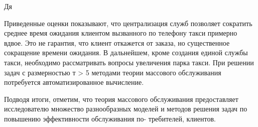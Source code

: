 Дя

Приведенные оценки показывают, что централизация служб позволяет сократить среднее время ожидания клиентом вызванного по телефону такси примерно вдвое. Это не гарантия, что клиент откажется от заказа, но существенное сокращение времени ожидания. В дальнейшем, кроме создания единой службы такси, необходимо рассматривать вопросы увеличения парка такси. При решении задач с размерностью т > 5 методами теории массового обслуживания потребуется автоматизированное вычисление.

Подводя итоги, отметим, что теория массового обслуживания предоставляет исследователю множество разнообразных моделей и методов решения задач по повышению эффективности обслуживания по-
требителей, клиентов.